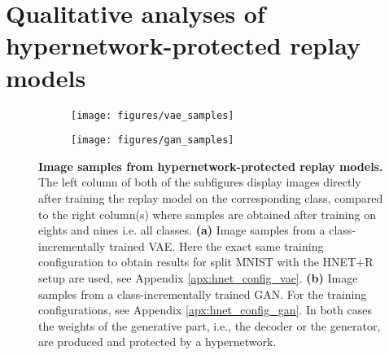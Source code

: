 \documentclass{article}
\begin{document}
\section{Qualitative analyses of hypernetwork-protected replay models}
\label{apx:qualitative-replay-experiments}
\begin{figure}[htbp!]
    \centering
    \begin{subfigure}{0.49\linewidth}
    \caption{}
    \texttt{[image: figures/vae\_samples]}
    \end{subfigure}
    \begin{subfigure}{0.49\linewidth}
    \caption{}
    \texttt{[image: figures/gan\_samples]}
    \end{subfigure}
    \caption{\textbf{Image samples from hypernetwork-protected replay models.} The left column of both of the subfigures display images directly after training the replay model on the corresponding class, compared to the right column(s) where samples are obtained after training on eights and nines i.e. all classes. \textbf{(a)} Image samples from a class-incrementally trained VAE. Here the exact same training configuration to obtain results for split MNIST with the HNET+R setup are used, see Appendix \ref{apx:hnet_config_vae}. \textbf{(b)} Image samples from a class-incrementally trained GAN. For the training configurations, see Appendix \ref{apx:hnet_config_gan}. In both cases the weights of the generative part, i.e., the decoder or the generator, are produced and protected by a hypernetwork. \label{fig:generated-digits}
    }
\end{figure}
\end{document}
